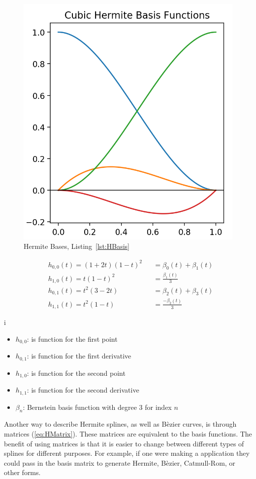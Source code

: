 \documentclass[12pt, letterpaper]{article}
\begin{document}
\begin{figure}[!h]
  \centering
  \caption{Hermite Bases, Listing~\ref{lst:HBasis}}
  \label{fig:HBasisGraphs}
  \includegraphics[width=.3\linewidth]{Basis/HBasis}
  \vspace{-10pt}
\end{figure}
\begin{singlespace}
  \begin{equation}
    \begin{aligned}
      &h_{0,0}(t) = (1+2t)(1-t)^2 &&= \beta_0(t) + \beta_1(t) \\
      &h_{1,0}(t) = t(1-t)^2 &&= \frac{\beta_1(t)}{3}\\
      &h_{0,1}(t) = t^2(3-2t) &&= \beta_2(t) + \beta_3(t)\\
      &h_{1,1}(t) = t^2(1-t) &&= \frac{-\beta_2(t)}{3}
    \end{aligned}
  \end{equation}
  \begin{small}
  i  \begin{itemize}[label=]
      \item $h_{0,0}$: is function for the first point
      \item $h_{0,1}$: is function for the first derivative
      \item $h_{1,0}$: is function for the second point
      \item $h_{1,1}$: is function for the second derivative
      \item $\beta_n$: Bernstein basis function with degree 3 for index $n$
    \end{itemize}
  \end{small}
\end{singlespace}


Another way to describe Hermite splines, as well as B\`ezier curves, is through matrices (\ref{eq:HMatrix}).
These matrices are equivalent to the basis functions. The benefit of using matrices is that it is easier to
change between different types of splines for different purposes. For example, if one were making a
application they could pass in the basis matrix to generate Hermite, B\`ezier, Catmull-Rom, or other forms.
\end{document}
